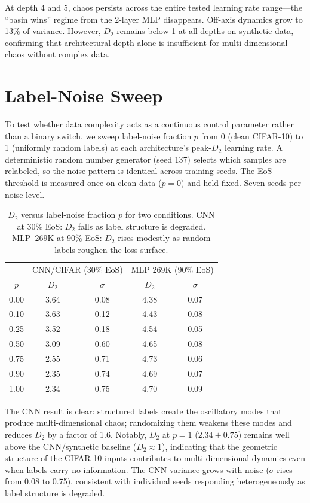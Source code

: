 \documentclass[aps,prl,twocolumn,superscriptaddress,floatfix]{revtex4-2}
\begin{document}
At depth 4 and 5, chaos persists across the entire tested learning rate range---the ``basin wins'' regime from the 2-layer MLP disappears. Off-axis dynamics grow to 13\% of variance. However, $D_2$ remains below 1 at all depths on synthetic data, confirming that architectural depth alone is insufficient for multi-dimensional chaos without complex data.

\section{Label-Noise Sweep}

To test whether data complexity acts as a continuous control parameter rather than a binary switch, we sweep label-noise fraction $p$ from 0 (clean CIFAR-10) to 1 (uniformly random labels) at each architecture's peak-$D_2$ learning rate. A deterministic random number generator (seed 137) selects which samples are relabeled, so the noise pattern is identical across training seeds. The EoS threshold is measured once on clean data ($p=0$) and held fixed. Seven seeds per noise level.

\begin{table}[h]
\caption{\label{tab:label_noise}%
$D_2$ versus label-noise fraction $p$ for two conditions. CNN at 30\% EoS: $D_2$ falls as label structure is degraded. MLP~269K at 90\% EoS: $D_2$ rises modestly as random labels roughen the loss surface.}
\begin{ruledtabular}
\begin{tabular}{ccccc}
 & \multicolumn{2}{c}{CNN/CIFAR (30\% EoS)} & \multicolumn{2}{c}{MLP 269K (90\% EoS)}\\
$p$ & $D_2$ & $\sigma$ & $D_2$ & $\sigma$\\
\hline
0.00 & 3.64 & 0.08 & 4.38 & 0.07\\
0.10 & 3.63 & 0.12 & 4.43 & 0.08\\
0.25 & 3.52 & 0.18 & 4.54 & 0.05\\
0.50 & 3.09 & 0.60 & 4.65 & 0.08\\
0.75 & 2.55 & 0.71 & 4.73 & 0.06\\
0.90 & 2.35 & 0.74 & 4.69 & 0.07\\
1.00 & 2.34 & 0.75 & 4.70 & 0.09\\
\end{tabular}
\end{ruledtabular}
\end{table}

The CNN result is clear: structured labels create the oscillatory modes that produce multi-dimensional chaos; randomizing them weakens these modes and reduces $D_2$ by a factor of 1.6. Notably, $D_2$ at $p = 1$ ($2.34 \pm 0.75$) remains well above the CNN/synthetic baseline ($D_2 \approx 1$), indicating that the geometric structure of the CIFAR-10 inputs contributes to multi-dimensional dynamics even when labels carry no information. The CNN variance grows with noise ($\sigma$ rises from 0.08 to 0.75), consistent with individual seeds responding heterogeneously as label structure is degraded.
\end{document}
